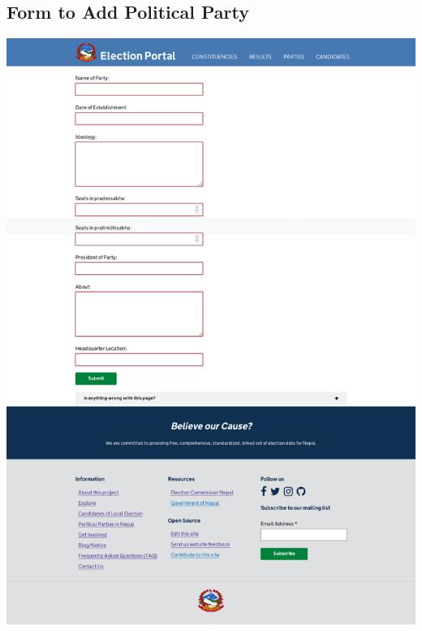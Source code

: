 \documentclass[12pt]{article}
\begin{document}
\subsection{Form to Add Political Party}
\begin{center}
\includegraphics[scale=0.25]{Form_To_Add_Political_Party.png}
\end{center}
\end{document}
